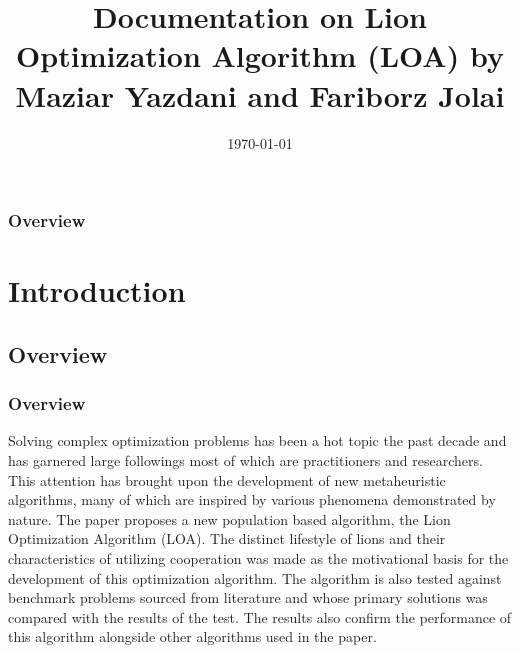 \documentclass{beamer}
\title[Documentation on LOA]{Documentation on Lion Optimization Algorithm (LOA) by Maziar Yazdani and Fariborz Jolai} %
\author[Tyrel Dogup, Deo Fetalvero]
{%
   \texorpdfstring{
        \begin{columns}
            \column{.45\linewidth}
            \centering
            Tyrel Justin A. Dogup\\
            \href{mailto:tadogup1@up.edu.ph}{tadogup1@up.edu.ph}
            \column{.45\linewidth}
            \centering
            Deo Franc M. Fetalvero\\
            \href{mailto:dmfetalvero@up.edu.ph}{dmfetalvero@up.edu.ph}
        \end{columns}
   }
   {John Doe \& Jane Doe}
}
\date{\today} %
\begin{document}
\begin{frame}
\titlepage %
\end{frame}

\begin{frame}
\frametitle{Overview} %
\tableofcontents %
\end{frame}


\section{Introduction} %

\subsection{Overview} %

\begin{frame}
\frametitle{Overview}
Solving complex optimization problems has been a hot topic the past decade and has garnered large followings most of which are practitioners and researchers. This attention has brought upon the development of new metaheuristic algorithms, many of which are inspired by various phenomena demonstrated by nature.
The paper proposes a new population based algorithm, the Lion Optimization Algorithm (LOA). The distinct lifestyle of lions and their characteristics of utilizing cooperation was made as the motivational basis for the development of this optimization algorithm. The algorithm is also tested against benchmark problems sourced from literature and whose primary solutions was compared with the results of the test. The results also confirm the performance of this algorithm alongside other algorithms used in the paper.
\end{frame}
\end{document}
